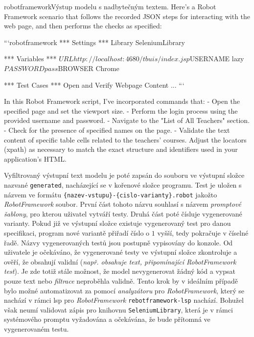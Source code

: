 \documentclass[czech, ma, kiv, he, iso690alph, pdf, viewonly]{fasthesis}
\begin{document}
        \begin{code}{robotframework}{Výstup modelu s nadbytečným textem. \label{lst:text_around}}
Here's a Robot Framework scenario that follows the recorded JSON steps for interacting with the web page, and then performs the checks as specified:

```robotframework
*** Settings ***
Library           SeleniumLibrary

*** Variables ***
${URL}            http://localhost:4680/tbuis/index.jsp
${USERNAME}       lazy
${PASSWORD}       pass
${BROWSER}        Chrome

*** Test Cases ***
Open and Verify Webpage Content
...
```

In this Robot Framework script, I've incorporated commands that:
- Open the specified page and set the viewport size.
- Perform the login process using the provided username and password.
- Navigate to the "List of All Teachers" section.
- Check for the presence of specified names on the page.
- Validate the text content of specific table cells related to the teachers' courses.
Adjust the locators (xpath) as necessary to match the exact structure and identifiers used in your application's HTML.
        \end{code}

        Vyfiltrovaný výstupní text modelu je poté zapsán do souboru ve výstupní složce nazvané \verb|generated|, nacházející se v kořenové složce programu. Test je uložen s názvem ve formátu \verb|{nazev-vstupu}-{cislo-varianty}.robot| jakožto \textit{RobotFramework} soubor. První část tohoto názvu souhlasí s názvem \textit{promptové šablony}, pro kterou uživatel vytváří testy. Druhá část poté čísluje vygenerované varianty. Pokud již ve výstupní složce existuje vygenerovaný test pro danou specifikaci, program nové variantě přiřadí číslo o \(1\) vyšší, tedy pokračuje v číselné řadě. Názvy vygenerovaných testů jsou postupně vypisovány do konzole. Od uživatele je očekáváno, že vygenerované testy ve výstupní složce zkontroluje a ověří, že obsahují validní (\textit{např. obsahuje text, připomínající RobotFramework test}). Je zde totiž stále možnost, že model nevygenerovat žádný kód a vypsat pouze text nebo \textit{filtrace} neproběhla validně. Tento krok by v ideálním případě bylo možné automatizovat za pomocí \textit{analyzátoru} pro \textit{RobotFramework}, který se nachází v rámci \Gls{lsp} pro \textit{RobotFramework} \verb|rebotframework-lsp| nachází. Bohužel však neumí validovat zápis pro knihovnu \verb|SeleniumLibrary|, která je v rámci systémového promptu vyžadována a očekávána, že bude přítomná ve vygenerovaném testu.
\end{document}
